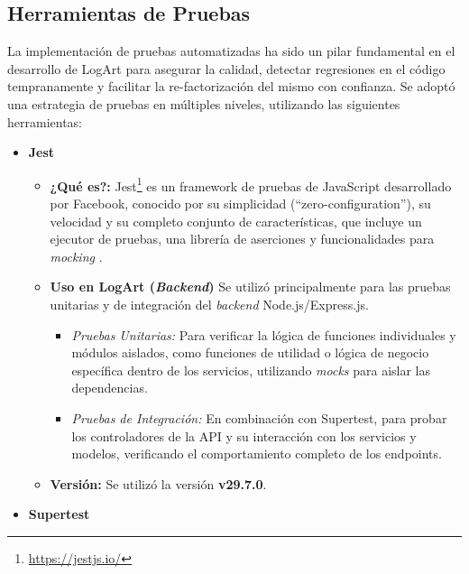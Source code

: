 \subsection{Herramientas de Pruebas}
\label{sec:herramientasPruebas}

La implementación de pruebas automatizadas ha sido un pilar fundamental en el desarrollo de LogArt para asegurar la calidad, detectar regresiones en el código tempranamente y facilitar la re-factorización del mismo con confianza. Se adoptó una estrategia de pruebas en múltiples niveles, utilizando las siguientes herramientas:

    \begin{itemize}
        \item \textbf{Jest}
            \begin{itemize}
                \item \textbf{¿Qué es?:} Jest\footnote{\url{https://jestjs.io/}} es un framework de pruebas de JavaScript desarrollado por Facebook, conocido por su simplicidad (``zero-configuration''), su velocidad y su completo conjunto de características, que incluye un ejecutor de pruebas, una librería de aserciones y funcionalidades para \textit{mocking} \cite{testimJestIntro}.
                \item \textbf{Uso en LogArt (\textit{Backend})} Se utilizó principalmente para las pruebas unitarias y de integración del \textit{backend} Node.js/Express.js. 
                    \begin{itemize}
                        \item \textit{Pruebas Unitarias:} Para verificar la lógica de funciones individuales y módulos aislados, como funciones de utilidad o lógica de negocio específica dentro de los servicios, utilizando \textit{mocks} para aislar las dependencias.
                        \item \textit{Pruebas de Integración:} En combinación con Supertest, para probar los controladores de la API y su interacción con los servicios y modelos, verificando el comportamiento completo de los endpoints.
                    \end{itemize}
                \item \textbf{Versión:} Se utilizó la versión \textbf{v29.7.0}.
            \end{itemize}
        \vspace{0.3cm}
        \item \textbf{Supertest}
            \begin{itemize}

\end{itemize}
\end{itemize}
